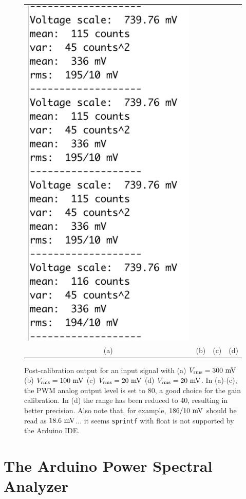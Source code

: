 \documentclass[12pt]{article}
\begin{document}
\begin{figure}[htbp]
\begin{center}
\begin{tabular}{cccc}
{\includegraphics[height=0.30\textheight]{figs/calibd.png}} \\
(a) & (b) & (c) & (d) \\
\end{tabular}
\end{center}
\caption{\label{fig:calib}   Post-calibration output for an input signal with (a) $V_{\rm rms}=300~\rm mV$ (b) $V_{\rm rms}=100~\rm mV$ (c) $V_{\rm rms}=20~\rm mV$ (d) $V_{\rm rms}=20~\rm mV$.  In (a)-(c), the PWM analog output level is set to 80, a good choice for the gain calibration.  In (d) the range has been reduced to 40, resulting in better precision.  Also note that, for example, $186/10~\rm mV$ should be read as $18.6~\rm mV$... it seems {\tt sprintf} with float is not supported by the Arduino IDE.}
\end{figure}

\section{The Arduino Power Spectral Analyzer}
\end{document}
